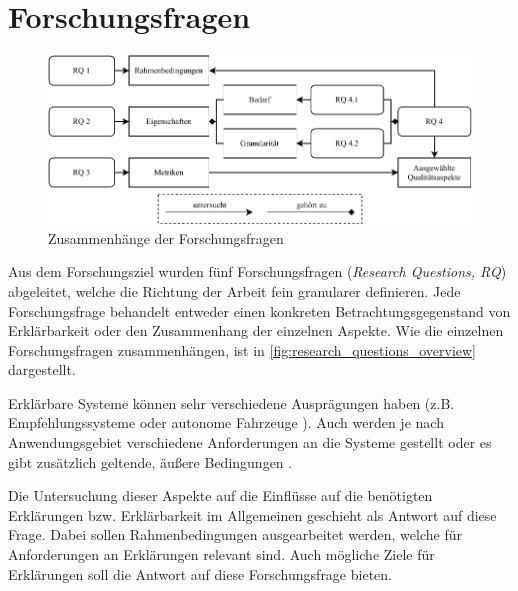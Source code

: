 \section{Forschungsfragen}

\begin{figure}[htb!]
    \includegraphics[width=\textwidth]{contents/03_research_design/res/research_questions_overview.pdf}
    \caption{Zusammenhänge der Forschungsfragen}
    \label{fig:research_questions_overview}
\end{figure}

Aus dem Forschungsziel wurden fünf Forschungsfragen (\textit{Research Questions, RQ}) abgeleitet, welche die Richtung der Arbeit fein granularer definieren. Jede Forschungsfrage behandelt entweder einen konkreten Betrachtungsgegenstand von Erklärbarkeit oder den Zusammenhang der einzelnen Aspekte. Wie die einzelnen Forschungsfragen zusammenhängen, ist in \autoref{fig:research_questions_overview} dargestellt.

\smallskip

\noindent{}

\smallskip

Erklärbare Systeme können sehr verschiedene Ausprägungen haben (z.B. Empfehlungssysteme \cite{kunkel_let_2019} oder autonome Fahrzeuge \cite{wiegand2019drive}). Auch werden je nach Anwendungsgebiet verschiedene Anforderungen an die Systeme gestellt oder es gibt zusätzlich geltende, äußere Bedingungen \cite{chazette_knowledge_nodate}.

Die Untersuchung dieser Aspekte auf die Einflüsse auf die benötigten Erklärungen bzw. Erklärbarkeit im Allgemeinen geschieht als Antwort auf diese Frage. Dabei sollen Rahmenbedingungen ausgearbeitet werden, welche für Anforderungen an Erklärungen relevant sind. Auch mögliche Ziele für Erklärungen soll die Antwort auf diese Forschungsfrage bieten. 

